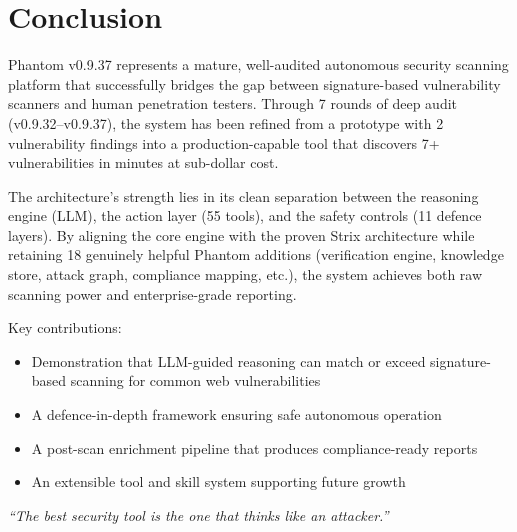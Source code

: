 \documentclass[12pt,a4paper]{report}
\begin{document}
\chapter{Conclusion}
\label{ch:conclusion}

Phantom v0.9.37 represents a mature, well-audited autonomous security scanning
platform that successfully bridges the gap between signature-based vulnerability
scanners and human penetration testers. Through 7 rounds of deep audit
(v0.9.32--v0.9.37), the system has been refined from a prototype with 2
vulnerability findings into a production-capable tool that discovers 7+
vulnerabilities in minutes at sub-dollar cost.

The architecture's strength lies in its clean separation between the reasoning
engine (LLM), the action layer (55 tools), and the safety controls (11 defence
layers). By aligning the core engine with the proven Strix architecture while
retaining 18 genuinely helpful Phantom additions (verification engine, knowledge
store, attack graph, compliance mapping, etc.), the system achieves both raw
scanning power and enterprise-grade reporting.

Key contributions:
\begin{itemize}[noitemsep]
  \item Demonstration that LLM-guided reasoning can match or exceed signature-based
        scanning for common web vulnerabilities
  \item A defence-in-depth framework ensuring safe autonomous operation
  \item A post-scan enrichment pipeline that produces compliance-ready reports
  \item An extensible tool and skill system supporting future growth
\end{itemize}

\vspace{1cm}
\begin{center}
\textit{``The best security tool is the one that thinks like an attacker.''}
\end{center}


\appendix
\end{document}
